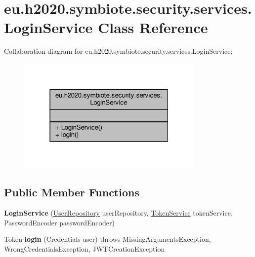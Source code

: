 \hypertarget{classeu_1_1h2020_1_1symbiote_1_1security_1_1services_1_1LoginService}{}\section{eu.\+h2020.\+symbiote.\+security.\+services.\+Login\+Service Class Reference}
\label{classeu_1_1h2020_1_1symbiote_1_1security_1_1services_1_1LoginService}


Collaboration diagram for eu.\+h2020.\+symbiote.\+security.\+services.\+Login\+Service\+:
\nopagebreak
\begin{figure}[H]
\begin{center}
\leavevmode
\includegraphics[width=259pt]{classeu_1_1h2020_1_1symbiote_1_1security_1_1services_1_1LoginService__coll__graph}
\end{center}
\end{figure}
\subsection*{Public Member Functions}
\begin{DoxyCompactItemize}
\item 
{\bfseries Login\+Service} (\hyperlink{interfaceeu_1_1h2020_1_1symbiote_1_1security_1_1repositories_1_1UserRepository}{User\+Repository} user\+Repository, \hyperlink{classeu_1_1h2020_1_1symbiote_1_1security_1_1services_1_1TokenService}{Token\+Service} token\+Service, Password\+Encoder password\+Encoder)\hypertarget{classeu_1_1h2020_1_1symbiote_1_1security_1_1services_1_1LoginService_ab115ee7595a83cd9e6c6455c5fe8ef8a}{}\label{classeu_1_1h2020_1_1symbiote_1_1security_1_1services_1_1LoginService_ab115ee7595a83cd9e6c6455c5fe8ef8a}

\item 
Token {\bfseries login} (Credentials user)  throws Missing\+Arguments\+Exception, Wrong\+Credentials\+Exception,             J\+W\+T\+Creation\+Exception \hypertarget{classeu_1_1h2020_1_1symbiote_1_1security_1_1services_1_1LoginService_a6a9c0152923a2526cfb9ecb7b143ad5d}{}\label{classeu_1_1h2020_1_1symbiote_1_1security_1_1services_1_1LoginService_a6a9c0152923a2526cfb9ecb7b143ad5d}

\end{DoxyCompactItemize}


